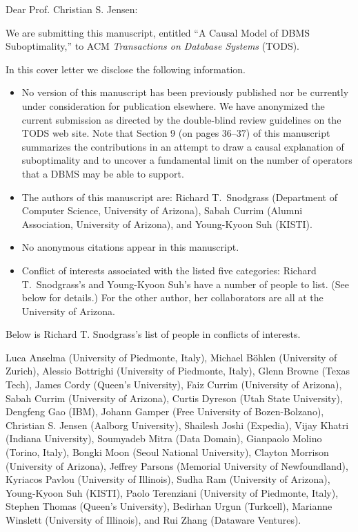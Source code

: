 \documentclass{letter} %
\begin{document}
\begin{letter}
 
\opening{Dear Prof. Christian S. Jensen:} 
 
We are submitting this manuscript, entitled ``A Causal Model of DBMS Suboptimality,'' to ACM {\em \hbox{Transactions} on Database Systems} (TODS).

In this cover letter we disclose the following information.

\begin{itemize}

\item No version of this manuscript has been previously published nor be currently under consideration for publication elsewhere. 
We have anonymized the current submission as directed by the double-blind
review guidelines on the TODS web site. Note that Section 9 (on pages 36--37) of
this manuscript summarizes the contributions in an attempt to draw 
a causal explanation of suboptimality and to uncover a fundamental limit 
on the number of operators that a DBMS may be able to support.
 
\item The authors of this manuscript are: Richard T.~Snodgrass (Department of
  Computer Science, University of Arizona), Sabah Currim (Alumni
  Association, University of Arizona), and Young-Kyoon Suh (KISTI). 
\item No anonymous citations appear in this manuscript.
\item Conflict of interests associated with the listed five categories:
  Richard T.~Snodgrass's and Young-Kyoon Suh's have a number of people to list. (See
  below for details.) For the other author, her collaborators are all at
  the University of Arizona.
\end{itemize} 

Below is Richard T. Snodgrass's list of people in conflicts of interests.

Luca Anselma (University of Piedmonte, Italy), Michael B\"{o}hlen
(University of Zurich), Alessio Bottrighi (University of Piedmonte, Italy),
Glenn Browne (Texas Tech), James Cordy (Queen's University), Faiz \hbox{Currim} (University of Arizona), Sabah
Currim (University of Arizona), Curtis Dyreson (Utah State University),
Dengfeng Gao (IBM), Johann Gamper (Free University of Bozen-Bolzano), Christian S. Jensen (Aalborg
University), Shailesh Joshi (Expedia), Vijay Khatri (Indiana University),
Soumyadeb Mitra (Data Domain), Gianpaolo Molino (Torino, Italy), Bongki Moon (Seoul National University), Clayton
Morrison (University of Arizona), Jeffrey Parsons (Memorial University of
Newfoundland), Kyriacos Pavlou (University of Illinois), Sudha Ram
(University of Arizona), Young-Kyoon Suh (KISTI), Paolo Terenziani (University of Piedmonte, Italy),
Stephen Thomas (Queen's University), Bedirhan Urgun (Turkcell), Marianne
Winslett (University of Illinois), and Rui Zhang (Dataware Ventures).\\


\end{letter}
\end{document}
